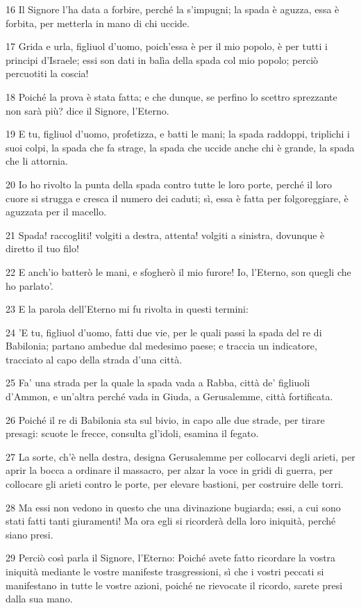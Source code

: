 \par 16 Il Signore l'ha data a forbire, perché la s'impugni; la spada è aguzza, essa è forbita, per metterla in mano di chi uccide.
\par 17 Grida e urla, figliuol d'uomo, poich'essa è per il mio popolo, è per tutti i principi d'Israele; essi son dati in balìa della spada col mio popolo; perciò percuotiti la coscia!
\par 18 Poiché la prova è stata fatta; e che dunque, se perfino lo scettro sprezzante non sarà più? dice il Signore, l'Eterno.
\par 19 E tu, figliuol d'uomo, profetizza, e batti le mani; la spada raddoppi, triplichi i suoi colpi, la spada che fa strage, la spada che uccide anche chi è grande, la spada che li attornia.
\par 20 Io ho rivolto la punta della spada contro tutte le loro porte, perché il loro cuore si strugga e cresca il numero dei caduti; sì, essa è fatta per folgoreggiare, è aguzzata per il macello.
\par 21 Spada! raccogliti! volgiti a destra, attenta! volgiti a sinistra, dovunque è diretto il tuo filo!
\par 22 E anch'io batterò le mani, e sfogherò il mio furore! Io, l'Eterno, son quegli che ho parlato'.
\par 23 E la parola dell'Eterno mi fu rivolta in questi termini:
\par 24 'E tu, figliuol d'uomo, fatti due vie, per le quali passi la spada del re di Babilonia; partano ambedue dal medesimo paese; e traccia un indicatore, tracciato al capo della strada d'una città.
\par 25 Fa' una strada per la quale la spada vada a Rabba, città de' figliuoli d'Ammon, e un'altra perché vada in Giuda, a Gerusalemme, città fortificata.
\par 26 Poiché il re di Babilonia sta sul bivio, in capo alle due strade, per tirare presagi: scuote le frecce, consulta gl'idoli, esamina il fegato.
\par 27 La sorte, ch'è nella destra, designa Gerusalemme per collocarvi degli arieti, per aprir la bocca a ordinare il massacro, per alzar la voce in gridi di guerra, per collocare gli arieti contro le porte, per elevare bastioni, per costruire delle torri.
\par 28 Ma essi non vedono in questo che una divinazione bugiarda; essi, a cui sono stati fatti tanti giuramenti! Ma ora egli si ricorderà della loro iniquità, perché siano presi.
\par 29 Perciò così parla il Signore, l'Eterno: Poiché avete fatto ricordare la vostra iniquità mediante le vostre manifeste trasgressioni, sì che i vostri peccati si manifestano in tutte le vostre azioni, poiché ne rievocate il ricordo, sarete presi dalla sua mano.
